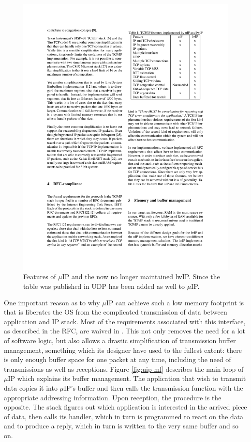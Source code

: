 \documentclass[final,a4paper,twoside,11pt,onecolumn]{report}
\begin{document}
\begin{figure}
   \centering
   \includegraphics[width=.9\linewidth]{dunkels-uip-and-lwip}
   \caption{Features of $\mu$IP and the now no longer maintained lwIP. Since the table was published in \citep[p.4]{dunkels2003full} UDP has been added as well to $\mu$IP.}
   \label{fig:uip-features}
\end{figure}

One important reason as to why $\mu$IP can achieve such a low memory footprint is that is liberates the OS from the complicated transmission of data between application and IP stack. Most of the requirements associated with this interface, as described in the RFC, are waived in \citep[p.4]{dunkels2003full}. This not only removes the need for a lot of software logic, but also allows a drastic simplification of transmission buffer management, something which its designer have used to the fullest extent: there is only enough buffer space for one packet at any time, including the need of transmissions as well as receptions. Figure \ref{fig:uip-ml} describes the main loop of $\mu$IP which explains its buffer management. The application that wish to transmit data copies it into $\mu$IP's buffer and then calls the transmission function with the appropriate addressing information. Upon reception, the procedure is the opposite. The stack figures out which application is interested in the arrived piece of data, then calls its handler, which in turn is programmed to react on the data and to produce a reply, which in turn is written to the very same buffer and so on.
\end{document}
